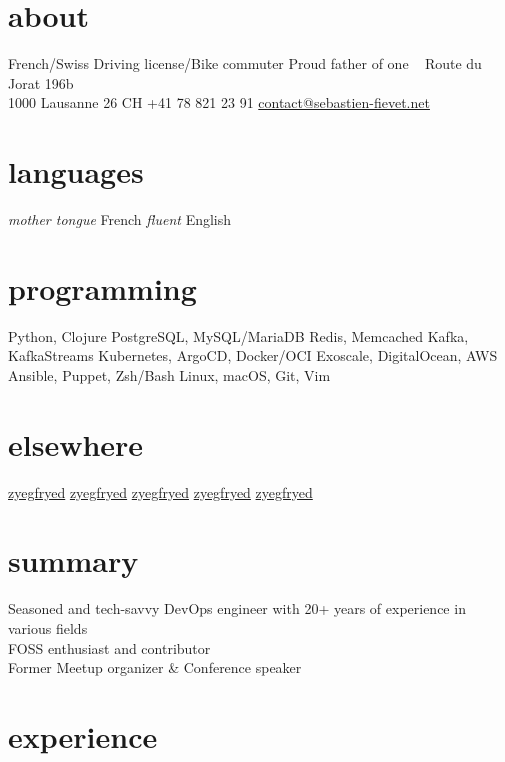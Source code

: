 \documentclass[]{friggeri}
\begin{document}

\begin{aside}
  \section{about}
    French/Swiss
    Driving license/Bike commuter
    Proud father of one
    ~
    {\FA \faHome} Route du Jorat 196b\\1000 Lausanne 26 CH
    {\FA \faPhone} +41 78 821 23 91
    {\FA \faEnvelope} \href{mailto:contact@sebastien-fievet.net}{contact@sebastien-fievet.net}
  \section{languages}
    \emph{mother tongue} French
    \emph{fluent} English
  \section{programming}
    {\color{red} {\FA \faHeart}} Python, Clojure
    PostgreSQL, MySQL/MariaDB
    Redis, Memcached
    Kafka, KafkaStreams
    Kubernetes, ArgoCD, Docker/OCI
    Exoscale, DigitalOcean, \ac{AWS}
    Ansible, Puppet, Zsh/Bash
    Linux, macOS, Git, Vim
  \section{elsewhere}
    \href{https://hachyderm.io/@zyegfryed}{{\FAB \faMastodon} zyegfryed}
    \href{https://github.com/zyegfryed}{{\FAB \faGithub} zyegfryed}
    \href{https://bitbucket.org/zyegfryed}{{\FAB \faBitbucket} zyegfryed}
    \href{https://speakerdeck.com/zyegfryed}{{\FA \faBullhorn} zyegfryed}
    \href{https://www.linkedin.com/in/zyegfryed}{{\FAB \faLinkedin} zyegfryed}
\end{aside}

\section{summary}

Seasoned and tech-savvy DevOps engineer with 20+ years of experience in various fields\\
\ac{FOSS} enthusiast and contributor\\
Former Meetup organizer \& Conference speaker

\section{experience}
\end{document}

